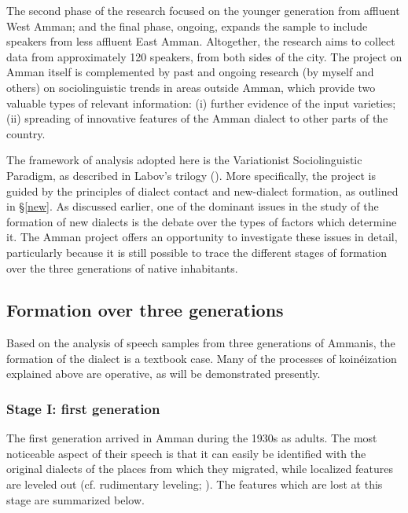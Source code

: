 \documentclass[output=paper]{langsci/langscibook}
\begin{document}
The second phase of the research focused on the younger generation from affluent West Amman; and the final phase, ongoing, expands the sample to include speakers from less affluent East Amman. Altogether, the research aims to collect data from approximately 120 speakers, from both sides of the city. The project on Amman itself is complemented by past and ongoing research (by myself and others) on sociolinguistic trends in areas outside Amman, which provide two valuable types of relevant information: (i) further evidence of the input varieties; (ii) spreading of innovative features of the Amman dialect to other parts of the country.

The framework of analysis adopted here is the Variationist Sociolinguistic Paradigm, as described in Labov’s trilogy (\citeyear{Labov1994,Labov2001,Labov2010}). More specifically, the project is guided by the principles of dialect contact and new-dialect formation, as outlined in §\ref{new}. As discussed earlier, one of the dominant issues in the study of the formation of new dialects is the debate over the types of factors which determine it. The Amman project offers an opportunity to investigate these issues in detail, particularly because it is still possible to trace the different stages of formation over the three generations of native inhabitants.

\subsection{Formation over three generations} \label{three}

Based on the analysis of speech samples from three generations of Ammanis, the formation of the dialect is a textbook case. Many of the processes of koinéization explained above are operative, as will be demonstrated presently.

\subsubsection{Stage I: first generation}

The first generation arrived in Amman during the 1930s as adults. The most noticeable aspect of their speech is that it can easily be identified with the original dialects of the places from which they migrated, while localized features are leveled out (cf. rudimentary leveling; \citealt{Trudgill2004}). The features which are lost at this stage are summarized below.
\end{document}

